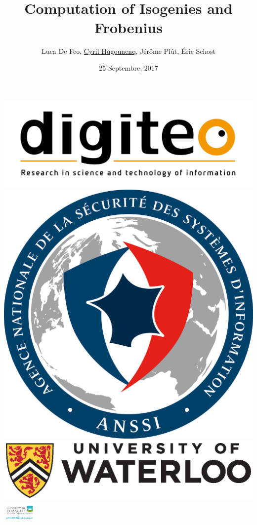 \documentclass[10pt,a4paper]{beamer}
\theoremstyle{plain}
\theoremstyle{definition}
\theoremstyle{definition}
\theoremstyle{definition}
\theoremstyle{definition}
\theoremstyle{remark}
\theoremstyle{remark}
\begin{document}
\author{
 Luca De Feo, \underline{Cyril Hugounenq}, J\'er\^ome Pl\^ut, \'Eric Schost
}
\title[Computation of Isogenies and Frobenius]{
Computation of Isogenies and Frobenius}
\date{25 Septembre, 2017}


\begin{frame}
\titlepage

\hfill
\includegraphics[scale=0.1]{Images/digiteo.jpg}\hfill
\includegraphics[scale=0.03]{Images/Anssi.png}\hfill
\includegraphics[scale=0.18]{Images/UniversityOfWaterloo_logo_horiz_pms.eps}\hfill
\includegraphics[height=10mm]{Images/uvsq-logo-cmjn.jpg}
\end{frame}
\end{document}
